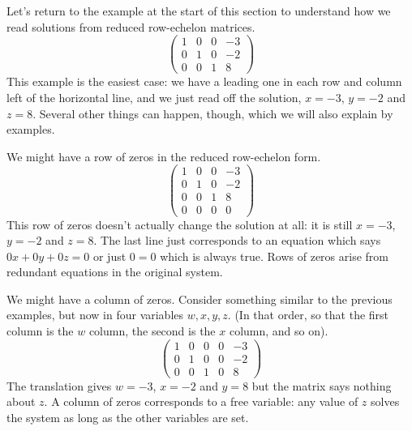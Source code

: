 \documentclass[fleqn]{report}
\begin{document}
\begin{example}
Let's return to the example at the start of this section to
understand how we read solutions from reduced row-echelon
matrices.
\begin{displaymath}
\left(
\begin{array}{ccc|c}
1 & 0 & 0 & -3 \\
0 & 1 & 0 & -2 \\
0 & 0 & 1 & 8
\end{array}
\right)
\end{displaymath}
This example is the easiest case: we have a leading one in
each row and column left of the horizontal line, and we just
read off the solution, $x=-3$, $y=-2$ and $z=8$. Several other
things can happen, though, which we will also explain by
examples.
\end{example}

\begin{example}
We might have a row of zeros in the reduced row-echelon form.
\begin{displaymath}
\left(
\begin{array}{ccc|c}
1 & 0 & 0 & -3 \\
0 & 1 & 0 & -2 \\
0 & 0 & 1 & 8 \\
0 & 0 & 0 & 0 
\end{array}
\right)
\end{displaymath}
This row of zeros doesn't actually change the solution at all:
it is still $x=-3$, $y=-2$ and $z=8$. The last line just
corresponds to an equation which says $0x + 0y + 0z = 0$ or just
$0=0$ which is always true. Rows of zeros arise from 
redundant equations in the original system.
\end{example}

\begin{example}
We might have a column of zeros. Consider something
similar to the previous examples, but now in four variables
$w,x,y,z$. (In that order, so that the first column is the $w$
column, the second is the $x$ column, and so on).
\begin{displaymath}
\left(
\begin{array}{cccc|c}
1 & 0 & 0 & 0 & -3 \\
0 & 1 & 0 & 0 & -2 \\
0 & 0 & 1 & 0 & 8
\end{array}
\right)
\end{displaymath}
The translation gives $w=-3$, $x=-2$ and $y=8$ but the matrix
says nothing about $z$. A column of zeros corresponds to a
free variable: any value of $z$ solves the system as long as
the other variables are set. 
\end{example}
\end{document}
